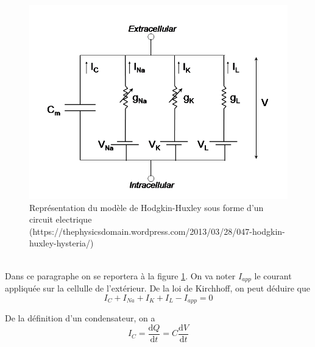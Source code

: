 \documentclass[12pt]{scrartcl}
\newcommand{\dd}{\mathrm{d}}
\begin{document}
\begin{figure}[!h]
\centering
\includegraphics[scale=0.5]{imgs/3.png}
\caption{Représentation du modèle de Hodgkin-Huxley sous forme d'un circuit electrique (\scriptsize{https://thephysicsdomain.wordpress.com/2013/03/28/047-hodgkin-huxley-hysteria/})}
\label{HHFIG}
\end{figure}

\clearpage 
~~\\
	Dans ce paragraphe on se reportera à la figure \ref{HHFIG}. On va noter $I_{app}$ le courant appliquée sur la cellulle de l'extérieur. De la loi de Kirchhoff, on peut déduire que \begin{equation} I_C+I_{Na}+I_K+I_L-I_{app} = 0  \label{Toteq}\end{equation} 

De la définition d'un condensateur, on a \begin{equation} I_C = \frac{\dd Q}{\dd t} = C\frac{\dd V}{\dd t} \label{Ceq}\end{equation} 
\end{document}
